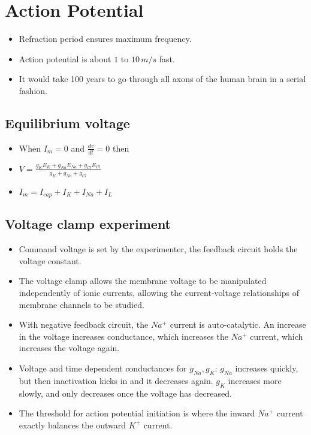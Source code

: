 \documentclass[main]{subfiles}
\begin{document}

\section{Action Potential}
\begin{itemize}[noitemsep,nolistsep]
	\item Refraction period ensures maximum frequency.
	\item Action potential is about $1$ to $10\,m/s$ fast.
	\item It would take 100 years to go through all axons of the human brain in a serial fashion.
\end{itemize}
\subsection{Equilibrium voltage}
\begin{itemize}[noitemsep,nolistsep]
	\item When $I_m = 0$ and $\frac{dv}{dt}=0$ then
	\item $V=\frac{g_KE_K+g_{Na}E_{Na}+g_{Cl}E_{Cl}}{g_K+g_{Na}+g_{Cl}}$
	\item $I_m = I_{cap}+I_K+I_{Na}+I_{L}$
\end{itemize}

\subsection{Voltage clamp experiment}
\begin{itemize}[noitemsep,nolistsep]
	\item Command voltage is set by the experimenter, the feedback circuit holds the voltage constant.
	\item The voltage clamp allows the membrane voltage to be manipulated independently of ionic currents, allowing the current-voltage relationships of membrane channels to be studied.
	\item With negative feedback circuit, the $Na^+$ current is auto-catalytic. An increase in the voltage increases conductance, which increases the $Na^+$ current, which increases the voltage again.
	\item Voltage and time dependent conductances for $g_{Na}, g_{K}$:
	\subitem $g_{Na}$ increases quickly, but then inactivation kicks in and it decreases again.
	\subitem $g_K$ increases more slowly, and only decreases once the voltage has decreased.
	\item The threshold for action potential initiation is where the inward $Na^+$ current exactly balances the outward $K^+$ current.
\end{itemize}
\end{document}
